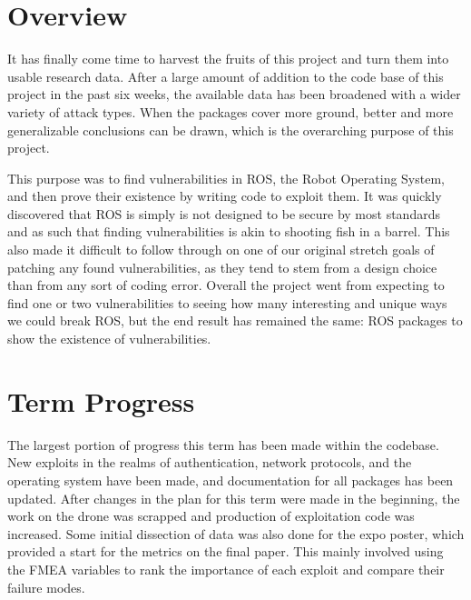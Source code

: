 \documentclass[IEEEtran,letterpaper,10pt,notitlepage,draftclsnofoot,onecolumn]{article}
\begin{document}
\newpage
{}
\tableofcontents
\clearpage

\section{Overview}
It has finally come time to harvest the fruits of this project and turn them into usable research data.
After a large amount of addition to the code base of this project in the past six weeks, the available data has been broadened with a wider variety of attack types.
When the packages cover more ground, better and more generalizable conclusions can be drawn, which is the overarching purpose of this project.

This purpose was to find vulnerabilities in ROS, the Robot Operating System, and then prove their existence by writing code to exploit them. 
It was quickly discovered that ROS is simply is not designed to be secure by most standards and as such that finding vulnerabilities is akin to shooting fish in a barrel. 
This also made it difficult to follow through on one of our original stretch goals of patching any found vulnerabilities, as they tend to stem from a design choice than from any sort of coding error. 
Overall the project went from expecting to find one or two vulnerabilities to seeing how many interesting and unique ways we could break ROS, but the end result has remained the same: ROS packages to show the existence of vulnerabilities. 


\section{Term Progress}
The largest portion of progress this term has been made within the codebase.
New exploits in the realms of authentication, network protocols, and the operating system have been made, and documentation for all packages has been updated.
After changes in the plan for this term were made in the beginning, the work on the drone was scrapped and production of exploitation code was increased.
Some initial dissection of data was also done for the expo poster, which provided a start for the metrics on the final paper.
This mainly involved using the FMEA variables to rank the importance of each exploit and compare their failure modes.

\end{document}
